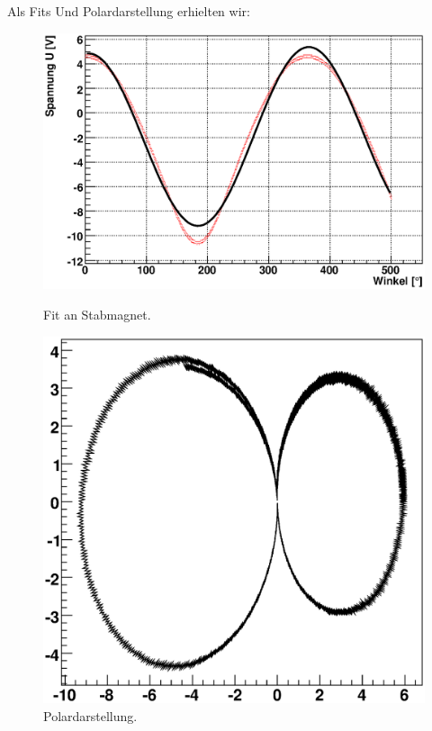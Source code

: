 \documentclass[12pt]{article}
\begin{document}
Als Fits Und Polardarstellung erhielten wir:
\begin{figure}[H]  
\begin{minipage}{0.49\linewidth}
\centering
\includegraphics[width=0.9\linewidth]{pictures/magnet.eps}
\caption{Fit an Stabmagnet.}
\end{minipage}
\begin{minipage}{0.5\linewidth}
\centering 
\includegraphics[width=0.9\linewidth]{pictures/magnetvd.eps}
\caption{Polardarstellung.}
\end{minipage}
\end{figure}
\end{document}
